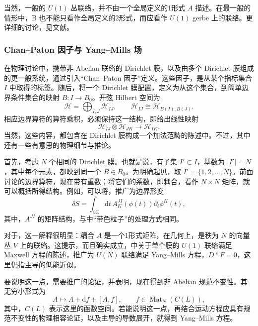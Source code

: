 当然，一般的 $U(1)$ 丛联络，并不由一个全局定义的1形式 $A$ 描述。在最一般的情形中，B 也不能只看作全局定义的2形式，而应看作 $U(1)$ gerbe 上的联络。更详细的讨论，见文献。

\subsubsection{Chan--Paton 因子与 Yang--Mills 场}\label{sec:3.5.2.8}

在物理讨论中，携带非 Abelian 联络的 Dirichlet 膜，以及由多个 Dirichlet 膜组成的更一般系统，通过引入“Chan--Paton 因子”定义。这些因子，是从某个指标集合 $I$ 中取得的标签。随后，将一个 Dirichlet 膜配置，定义为从这个集合，到简单边界条件集合的映射 $B\colon I\to B_0$。开弦 Hilbert 空间为
\[
\mathcal{H}=\bigoplus_{I,J}\mathcal{H}_{IJ},
\qquad\mathcal{H}_{IJ}\cong\mathcal{H}_{B(I),B(J)}.
\]
相应边界算符的算符乘积，必须保持这一结构，即给出线性映射
\[
\mathcal{H}_{IJ}\otimes\mathcal{H}_{JK}\longrightarrow\mathcal{H}_{IK}.
\]
当然，这些内容，都包含在 Dirichlet 膜构成一个加法范畴的陈述中。不过，其中还有一些有意思的物理细节与推论。

首先，考虑 $N$ 个相同的 Dirichlet 膜。也就是说，有子集 $I'\subset I$，基数为 $|I'|=N$，其中每个元素，都映到同一个 $B\in B_0$。为明确起见，取 $I'=\{1,2,\ldots,N\}$。前面讨论的边界算符，现在带有重数；将它们的系数，即耦合，看作 $N\times N$ 矩阵，就可以概括所得结构。例如，可以将，推广为边界形变
\begin{equation}\label{eq:3.152}
\delta S=\int_{\partial\Sigma}\mathrm{d}t\,
A^{JI}_K(\phi(t))\partial_t\phi^K(t),
\end{equation}
其中，$A^{JI}$ 的矩阵结构，与中“带色粒子”的处理方式相同。

对于，这一解释很明显：耦合 $A$ 是一个1形式矩阵，在几何上，是秩为 $N$ 的向量丛 $V$ 上的联络。这提示，而且确实成立，中关于单个膜的 $U(1)$ 联络满足 Maxwell 方程的陈述，推广为 $U(N)$ 联络满足 Yang--Mills 方程，$D*F=0$，这里仍指主导的低能近似。

要说明这一点，需要推广的论证，并表明，现在得到非 Abelian 规范不变性。其无穷小形式为
\begin{equation}\label{eq:3.153}
A\longmapsto A+\mathrm{d}f+[A,f],
\qquad f\in\operatorname{Mat}_N(C(L)),
\end{equation}
其中，$C(L)$ 表示这里的函数空间。若能说明这一点，再结合运动方程应具有规范不变性的物理相容论证，以及主导的导数展开，就得到 Yang--Mills 方程。

